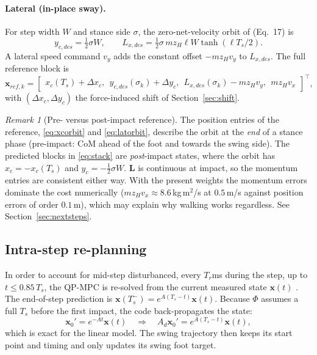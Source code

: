 \documentclass[11pt]{article}
\theoremstyle{remark}
\newtheorem{remark}{Remark}
\theoremstyle{definition}
\newcommand{\x}{\bm{x}}
\begin{document}
\paragraph{Lateral (in-place sway).} For step width $W$ and stance side $\sigma$,
the zero-net-velocity orbit of \cite{gibson2022} (Eq.~17) is
\begin{equation}
  y_{c,des}=\tfrac12\sigma W,\qquad L_{x,des}=\tfrac12\sigma\,m z_H\ell W\tanh(\ell T_s/2).
  \label{eq:latorbit}
\end{equation}
A lateral speed command $v_y$ adds the constant offset $-m z_H v_y$ to $L_{x,des}$. The full reference block is
\begin{equation}
  \x_{ref,k}=\begin{bmatrix}x_c(T_s)+\Delta x_c,\ \ y_{c,des}(\sigma_k)+\Delta y_c,\ \ L_{x,des}(\sigma_k)-m z_H v_y,\ \ m z_H v_x\end{bmatrix}^\top,
\end{equation}
with $(\Delta x_c,\Delta y_c)$ the force-induced shift of Section~\ref{sec:shift}.
\begin{remark}[Pre- versus post-impact reference]\label{rm:prepost}
The position entries of the reference, \eqref{eq:xcorbit} and \eqref{eq:latorbit}, describe the orbit at the
\emph{end} of a stance phase (pre-impact: CoM ahead of the foot and towards the swing side). The predicted
blocks in \eqref{eq:stack} are \emph{post}-impact states, where the orbit has $x_c=-x_c(T_s)$ and
$y_c=-\tfrac12\sigma W$. $\bm L$ is continuous at impact, so the momentum entries are consistent either way.
With the present weights the momentum errors dominate the cost numerically ($m z_H v_x\approx 8.6\,$kg\,m$^2$/s at
$0.5\,$m/s against position errors of order $0.1\,$m), which may explain why walking works regardless.
See Section~\ref{sec:nextsteps}.
\end{remark}

\subsection{Intra-step re-planning}
In order to account for mid-step disturbanced, every $T_r$ms during the step, up to $t\le 0.85\,T_s$, the QP-MPC is re-solved from the current measured state $\x(t)$
\cite{gibson2022}. The end-of-step prediction is $\x(T_s^-)=e^{A(T_s-t)}\x(t)$. Because $\Phi$ assumes a full
$T_s$ before the first impact, the code back-propagates the state:
\begin{equation}
  \x_0'=e^{-At}\x(t)\quad\Rightarrow\quad A_d\x_0'=e^{A(T_s-t)}\x(t),
\end{equation}
which is exact for the linear model. The swing trajectory then keeps its start point and timing and only
updates its swing foot target.
\end{document}

